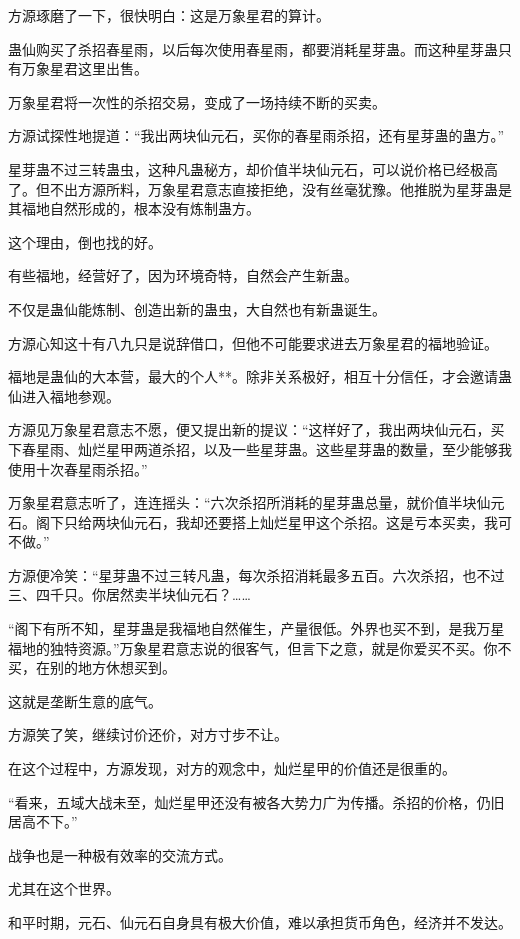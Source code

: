 \begin{this_body}
方源琢磨了一下，很快明白：这是万象星君的算计。

蛊仙购买了杀招春星雨，以后每次使用春星雨，都要消耗星芽蛊。而这种星芽蛊只有万象星君这里出售。

万象星君将一次性的杀招交易，变成了一场持续不断的买卖。

方源试探性地提道：“我出两块仙元石，买你的春星雨杀招，还有星芽蛊的蛊方。”

星芽蛊不过三转蛊虫，这种凡蛊秘方，却价值半块仙元石，可以说价格已经极高了。但不出方源所料，万象星君意志直接拒绝，没有丝毫犹豫。他推脱为星芽蛊是其福地自然形成的，根本没有炼制蛊方。

这个理由，倒也找的好。

有些福地，经营好了，因为环境奇特，自然会产生新蛊。

不仅是蛊仙能炼制、创造出新的蛊虫，大自然也有新蛊诞生。

方源心知这十有八九只是说辞借口，但他不可能要求进去万象星君的福地验证。

福地是蛊仙的大本营，最大的个人**。除非关系极好，相互十分信任，才会邀请蛊仙进入福地参观。

方源见万象星君意志不愿，便又提出新的提议：“这样好了，我出两块仙元石，买下春星雨、灿烂星甲两道杀招，以及一些星芽蛊。这些星芽蛊的数量，至少能够我使用十次春星雨杀招。”

万象星君意志听了，连连摇头：“六次杀招所消耗的星芽蛊总量，就价值半块仙元石。阁下只给两块仙元石，我却还要搭上灿烂星甲这个杀招。这是亏本买卖，我可不做。”

方源便冷笑：“星芽蛊不过三转凡蛊，每次杀招消耗最多五百。六次杀招，也不过三、四千只。你居然卖半块仙元石？……

“阁下有所不知，星芽蛊是我福地自然催生，产量很低。外界也买不到，是我万星福地的独特资源。”万象星君意志说的很客气，但言下之意，就是你爱买不买。你不买，在别的地方休想买到。

这就是垄断生意的底气。

方源笑了笑，继续讨价还价，对方寸步不让。

在这个过程中，方源发现，对方的观念中，灿烂星甲的价值还是很重的。

“看来，五域大战未至，灿烂星甲还没有被各大势力广为传播。杀招的价格，仍旧居高不下。”

战争也是一种极有效率的交流方式。

尤其在这个世界。

和平时期，元石、仙元石自身具有极大价值，难以承担货币角色，经济并不发达。


\end{this_body}
